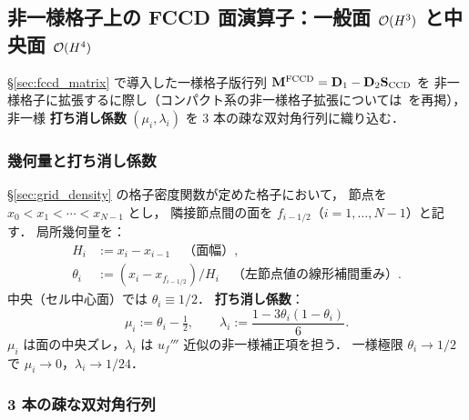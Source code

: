 %
%
\subsection{非一様格子上の FCCD 面演算子：一般面 \texorpdfstring{$\mathcal{O}(H^3)$}{O(H3)} と中央面 \texorpdfstring{$\mathcal{O}(H^4)$}{O(H4)}}
\label{sec:fccd_nonuniform}

\S\ref{sec:fccd_matrix} で導入した一様格子版行列
$\mathbf{M}^{\mathrm{FCCD}} = \mathbf{D}_1 - \mathbf{D}_2\mathbf{S}_{\mathrm{CCD}}$ を
非一様格子に拡張するに際し（コンパクト系の非一様格子拡張については~\cite{Lele1992}を再掲），
非一様 \textbf{打ち消し係数} $(\mu_i,\lambda_i)$ を
3 本の疎な双対角行列に織り込む．

\subsubsection{幾何量と打ち消し係数}
\label{sec:fccd_nu_geometry}

\S\ref{sec:grid_density} の格子密度関数が定めた格子において，
節点を $x_0 < x_1 < \cdots < x_{N-1}$ とし，
隣接節点間の面を $f_{i-1/2}$（$i=1,\ldots,N-1$）と記す．
局所幾何量を：
\begin{align}
  H_i &:= x_i - x_{i-1} \quad\text{（面幅）}, \label{eq:fccd_nu_Hi}\\
  \theta_i &:= (x_i - x_{f_{i-1/2}})/H_i \quad\text{（左節点値の線形補間重み）}. \label{eq:fccd_nu_theta}
\end{align}
中央（セル中心面）では $\theta_i \equiv 1/2$．
\textbf{打ち消し係数}：
\begin{equation}
  \mu_i := \theta_i - \tfrac{1}{2},
  \qquad
  \lambda_i := \frac{1 - 3\theta_i(1-\theta_i)}{6}.
  \label{eq:fccd_nu_mulambda}
\end{equation}
$\mu_i$ は面の中央ズレ，$\lambda_i$ は $u_f'''$ 近似の非一様補正項を担う．
一様極限 $\theta_i\to 1/2$ で $\mu_i\to 0$，$\lambda_i\to 1/24$．

\subsubsection{3 本の疎な双対角行列}
\label{sec:fccd_nu_matrices}

